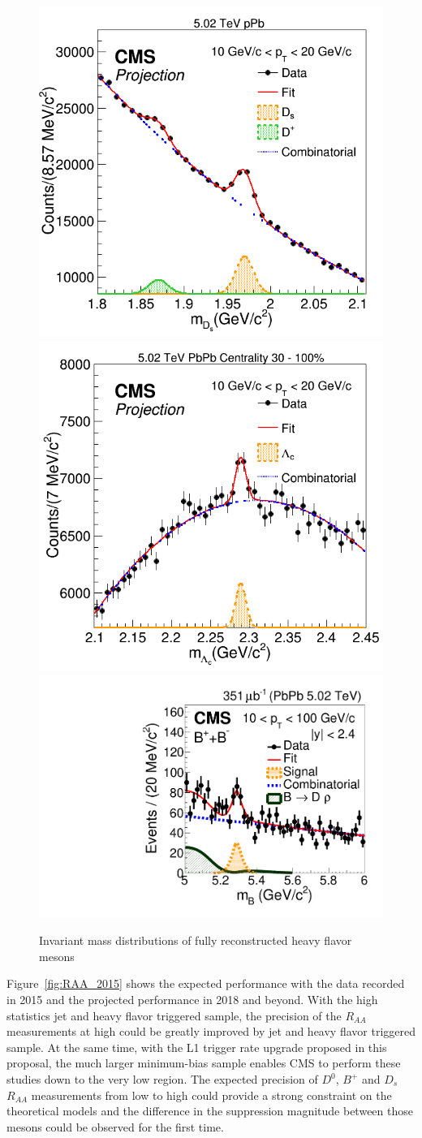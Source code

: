 \begin{figure}[!ht]
\begin{center}
\includegraphics[width=.32\textwidth]{InvMassFigures/Ds.png}
\includegraphics[width=.32\textwidth]{InvMassFigures/LambdaC.png}
\includegraphics[width=.335\textwidth]{InvMassFigures/BtoDpi_data_PbPb_10_100.pdf}
\caption{Invariant mass distributions of fully reconstructed heavy flavor mesons}
\label{fig:HFMesonMass}
\end{center}
\end{figure}

Figure~\ref{fig:RAA_2015} shows the expected performance with the data recorded in 2015 and the projected performance in 2018 and beyond. With the high statistics jet and heavy flavor triggered sample, the precision of the $R_{AA}$ measurements at high \pt could be greatly improved by jet and heavy flavor triggered sample. At the same time, with the L1 trigger rate upgrade proposed in this proposal, the much larger minimum-bias sample enables CMS to perform these studies down to the very low \pt region. The expected precision of $D^0$, $B^+$ and $D_s$ $R_{AA}$ measurements from low \pt to high \pt could provide a strong constraint on the theoretical models and the difference in the suppression magnitude between those mesons could be observed for the first time.


